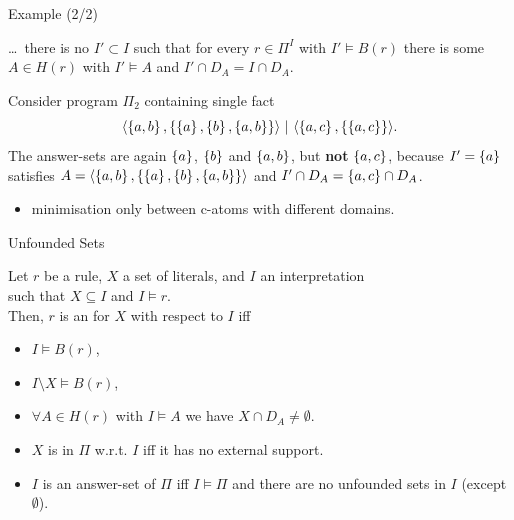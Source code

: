 \documentclass[trans,draft]{beamer} %
\newcommand{\catom}[2]{\ensuremath{\langle #1, #2 \rangle}}
\begin{document}
\begin{frame}{Example (2/2)}

	\ldots\ there is no $I' \subset I$ such that for every $r \in \Pi^I$ with $I' \models B(r)$ there is some $A \in H(r)$ with
	$I' \models A$ and $I' \cap D_A = I \cap D_A$.

	\begin{example}[2]
	Consider program $\Pi_2$ containing single fact
	$$\catom{\set{a,b}}{\set{\set{a}, \set{b}, \set{a,b}}} \ |\  \catom{\set{a,c}}{\set{\set{a,c}}}.$$
	The answer-sets are again $\left\{{a}\right\}$, $\left\{{b}\right\}$ and $\left\{{a,b}\right\}$, but \textbf{not} $\left\{{a,c}\right\}$,\newline
	because $I' = \left\{{a}\right\}$ satisfies $A = \catom{\set{a,b}}{\set{\set{a}, \set{b}, \set{a,b}}}$\newline
	and $I' \cap D_A = \left\{{a,c}\right\} \cap D_A$.
	\end{example}

	\pause

	\begin{itemize}
		\item minimisation only between c-atoms with different domains.
	\end{itemize}

\end{frame}

\begin{frame}{Unfounded Sets}

	\begin{definition}
	Let $r$ be a rule, $X$ a set of literals, and $I$ an interpretation\\
	such that $X \subseteq I$ and $I \models r$.\\
	Then, $r$ is an \emph{} for $X$ with respect to $I$ iff
	\begin{itemize}
		\item $I \models B(r)$,
		\item $I \setminus X \models B(r)$,
		\item $\forall A \in H(r)$ with $I \models A$ we have $X \cap D_A \neq \emptyset$.
	\end{itemize}
	\end{definition}

	\pause

	\begin{itemize}
		\item $X$ is \emph{} in $\Pi$ w.r.t. $I$ iff it has no external support.
		\item $I$ is an answer-set of $\Pi$ iff $I \models \Pi$ and there are no unfounded sets in $I$ (except $\emptyset$).
	\end{itemize}

\end{frame}
\end{document}

